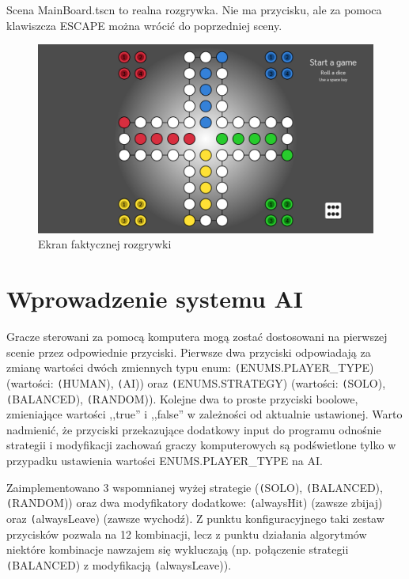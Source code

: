 \documentclass[conference]{IEEEtran}
\begin{document}
Scena MainBoard.tscn to realna rozgrywka. Nie ma przycisku, ale za pomoca klawiszcza ESCAPE można wrócić do poprzedniej sceny.

\begin{figure}[H]
    \centering
    \includegraphics[width=\linewidth]{Scene_2.png}
    \caption{Ekran faktycznej rozgrywki}
\end{figure}

\section{Wprowadzenie systemu AI}
Gracze sterowani za pomocą komputera mogą zostać dostosowani na pierwszej scenie przez odpowiednie przyciski. Pierwsze dwa przyciski odpowiadają za zmianę wartości dwóch zmiennych typu enum: \texttt(ENUMS.PLAYER\_TYPE) (wartości: \texttt(HUMAN), \texttt(AI)) oraz \texttt(ENUMS.STRATEGY) (wartości: \texttt(SOLO), \texttt(BALANCED), \texttt(RANDOM)). Kolejne dwa to proste przyciski boolowe, zmieniające wartości ,,true'' i ,,false'' w zależności od aktualnie ustawionej. Warto nadmienić, że przyciski przekazujące dodatkowy input do programu odnośnie strategii i modyfikacji zachowań graczy komputerowych są podświetlone tylko w przypadku ustawienia wartości ENUMS.PLAYER\_TYPE na AI.


Zaimplementowano 3 wspomnianej wyżej strategie (\texttt(SOLO), \texttt(BALANCED), \texttt(RANDOM)) oraz dwa modyfikatory dodatkowe: \texttt(alwaysHit) (zawsze zbijaj) oraz \texttt(alwaysLeave) (zawsze wychodź). Z punktu konfiguracyjnego taki zestaw przycisków pozwala na 12 kombinacji, lecz z punktu działania algorytmów niektóre kombinacje nawzajem się wykluczają (np. połączenie strategii \texttt(BALANCED) z modyfikacją \texttt(alwaysLeave)).
\end{document}
